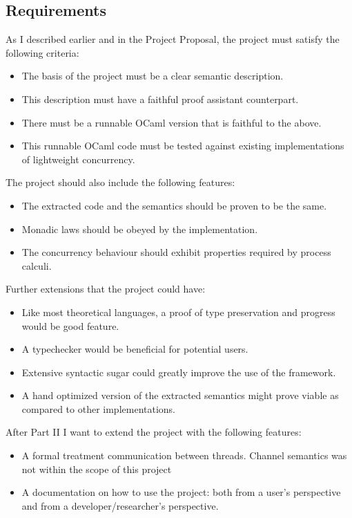\documentclass[12pt,twoside,notitlepage]{report}
\theoremstyle{plain}%
\theoremstyle{definition}
\theoremstyle{remark}
\begin{document}
\subsection{Requirements}
As I described earlier and in the Project Proposal, the project must satisfy the following criteria:
\begin{itemize}
\item{The basis of the project must be a clear semantic description.}
\item{This description must have a faithful proof assistant counterpart.}
\item{There must be a runnable OCaml version that is faithful to the above.}
\item{This runnable OCaml code must be tested against existing implementations of lightweight concurrency.}
\end{itemize}
The project should also include the following features:
\begin{itemize}
\item{The extracted code and the semantics should be proven to be the same.}
\item{Monadic laws should be obeyed by the implementation.}
\item{The concurrency behaviour should exhibit properties required by process calculi.}
\end{itemize}
Further extensions that the project could have:
\begin{itemize}
\item{Like most theoretical languages, a proof of type preservation and progress would be good feature.}
\item{A typechecker would be beneficial for potential users.}
\item{Extensive syntactic sugar could greatly improve the use of the framework.}
\item{A hand optimized version of the extracted semantics might prove viable as compared to other implementations.}
\end{itemize}
After Part II I want to extend the project with the following features:
\begin{itemize}
\item{A formal treatment communication between threads. Channel semantics was not within the scope of this project}
\item{A documentation on how to use the project: both from a user's perspective and from a developer/researcher's perspective.}
\end{itemize}
\end{document}
